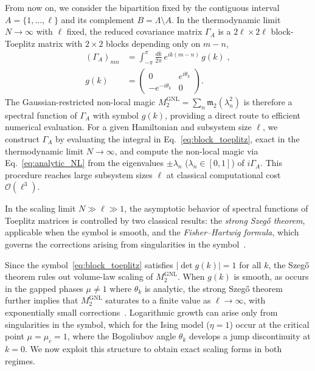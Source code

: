 \documentclass[prx,twocolumn,superscriptaddress,aps,10pt, frontmatterverbose, reprint,footinbib,longbibliography=true]{revtex4-2}
\providecommand{\DIFdeltex}[1]{} %
\providecommand{\DIFdelbegin}{} %
\providecommand{\DIFdelend}{} %
\providecommand{\DIFdel}[1]{\texorpdfstring{\DIFdeltex{#1}}{}} %
\begin{document}
From now on, we consider the bipartition fixed by the contiguous interval $A=\{1,\dots,\ell\}$ and its complement $B=\Lambda\setminus A$.
In the thermodynamic limit $N\to\infty$ with $\ell$ fixed, the reduced covariance matrix $\Gamma_A$ is a $2\ell\times 2\ell$ block-Toeplitz matrix with $2\times 2$ blocks depending only on $m-n$,
\begin{equation}
\begin{split}
    (\Gamma_A)_{mn} &= \int_{-\pi}^{\pi}\frac{dk}{2\pi}\,e^{ik(m-n)}\,g(k)\;,
    \\
    g(k) &= \begin{pmatrix} 0 & e^{i\theta_k} \\ -e^{-i\theta_k} & 0 \end{pmatrix}.
\end{split}
\label{eq:block_toeplitz}
\end{equation}
The Gaussian-restricted non-local magic $M_2^{\mathrm{GNL}} = \sum_n \mathfrak{m}_2(\lambda_n^2)$ is therefore a spectral function of $\Gamma_A$ with symbol $g(k)$, providing a direct route to efficient numerical evaluation.
For a given Hamiltonian and subsystem size $\ell$, we construct $\Gamma_A$ by evaluating the integral in Eq.~\eqref{eq:block_toeplitz}, exact in the thermodynamic limit $N\to\infty$, and compute the non-local magic via Eq.~\eqref{eq:analytic_NL} from the eigenvalues $\pm\lambda_n$ ($\lambda_n\in[0,1]$) of $i\Gamma_A$.
This procedure reaches large subsystem sizes $\ell$ at classical computational cost $\mathcal{O}(\ell^3)$.

In the scaling limit $N\gg \ell\gg 1$, the asymptotic behavior of spectral functions of Toeplitz matrices is controlled by two classical results: the \emph{strong Szeg\H{o} theorem}, applicable when the symbol is smooth, and the \emph{Fisher--Hartwig formula}, which governs the corrections arising from singularities in the symbol~\cite{Jin_2004,Its_2005}.

Since the symbol~\eqref{eq:block_toeplitz} satisfies $|\det g(k)| = 1$ for all $k$, the Szeg\H{o} theorem rules out volume-law scaling of $M_2^{\mathrm{GNL}}$.
When $g(k)$ is smooth, as occurs in the gapped phases $\mu \neq 1$ where $\theta_k$ is analytic, the strong Szeg\H{o} theorem further implies that $M_2^{\mathrm{GNL}}$ saturates to a finite value as $\ell \to \infty$, with exponentially small corrections~\cite{simon2010szego}.
Logarithmic growth can arise only from singularities in the symbol, which for the Ising model ($\eta=1$) occur at the critical point $\mu = \mu_c = 1$, where the Bogoliubov angle $\theta_k$ develops a jump discontinuity at $k = 0$\DIFdelbegin \DIFdel{(and $k = \pi$)}\DIFdelend .
We now exploit this structure to obtain exact scaling forms in both regimes.
\end{document}
